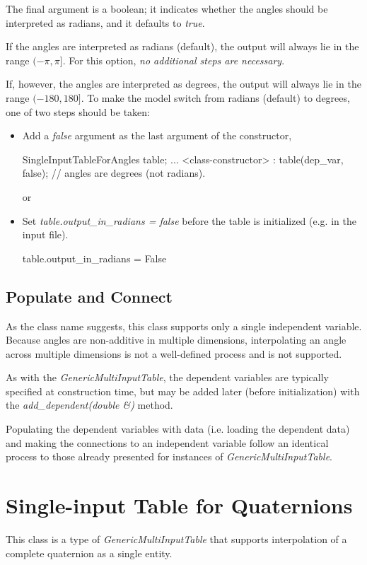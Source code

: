 \documentclass[11pt,fleqn]{report}
\begin{document}
The final argument is a boolean; it indicates whether the angles should be
interpreted as radians, and it defaults to \textit{true}.

If the angles are interpreted as radians (default), the output will always
lie in the range $(-\pi, \pi]$. For this option,
\textit{no additional steps are necessary}.

If, however, the angles are interpreted as degrees,
the output will always lie in the range $(-180, 180]$.
To make the model switch from radians (default) to degrees, one of two steps
should be taken:
\begin{itemize}
 \item Add a \textit{false} argument as the last argument of the constructor,
   \begin{code}
SingleInputTableForAngles table;
...
<class-constructor>
  :
  table(dep_var,
        false); // angles are degrees (not radians).
   \end{code}
       or
 \item Set \textit{table.output\_in\_radians = false} before the table is
       initialized (e.g. in the input file).
   \begin{code}
table.output_in_radians = False
   \end{code}
\end{itemize}

\subsection{Populate and Connect}

As the class name suggests, this class supports only a single independent
variable.  Because angles are non-additive in multiple dimensions,
interpolating an angle across multiple dimensions is not a well-defined
process and is not supported.

As with the \textit{GenericMultiInputTable}, the dependent variables are
typically specified at construction time, but may be added later (before
initialization) with the \textit{add\_dependent(double \&)} method.

Populating the dependent variables with data (i.e. loading the dependent
data) and making the connections to an independent
variable follow an identical process to those already
presented for instances of \textit{GenericMultiInputTable}.


\section{Single-input Table for Quaternions}\label{sec:UG_quaternions}
This class is a type of \textit{GenericMultiInputTable} that
supports interpolation of a complete quaternion as a single
entity.
\end{document}
